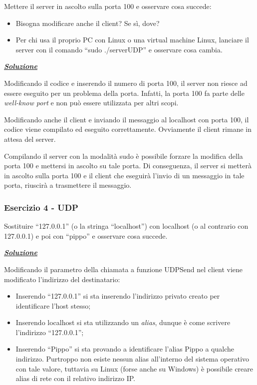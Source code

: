 \documentclass[a4paper]{article}
\newcommand{\dquotes}[1]{``#1''}
\begin{document}
	Mettere il server in ascolto sulla porta 100 e osservare cosa succede:
	\begin{itemize}
		\item Bisogna modificare anche il client? Se sì, dove?
		\item Per chi usa il proprio PC con Linux o una virtual machine Linux, lanciare il server con il comando \dquotes{\textsf{sudo ./serverUDP}} e osservare cosa cambia.
	\end{itemize}

	\noindent
	\textcolor{Green4}{\textbf{\emph{\underline{Soluzione}}}}\newline
	
	\noindent
	Modificando il codice e inserendo il numero di porta 100, il server non riesce ad essere eseguito per un problema della porta. Infatti, la porta 100 fa parte delle \emph{well-know port} e non può essere utilizzata per altri scopi.\newline
	
	\noindent
	Modificando anche il client e inviando il messaggio al localhost con porta 100, il codice viene compilato ed eseguito correttamente. Ovviamente il client rimane in attesa del server.\newline
	
	\noindent
	Compilando il server con la modalità \textsf{sudo} è possibile forzare la modifica della porta 100 e mettersi in ascolto su tale porta. Di conseguenza, il server si metterà in ascolto sulla porta 100 e il client che eseguirà l'invio di un messaggio in tale porta, riuscirà a trasmettere il messaggio.\newpage
	
	\subsubsection{Esercizio 4 - UDP}
	
	Sostituire \dquotes{127.0.0.1} (o la stringa \dquotes{localhost}) con localhost (o al contrario con 127.0.0.1) e poi con \dquotes{pippo} e osservare cosa succede.\newline
	
	\noindent
	\textcolor{Green4}{\textbf{\emph{\underline{Soluzione}}}}\newline
	
	\noindent
	Modificando il parametro della chiamata a funzione \textsf{UDPSend} nel client viene modificato l'indirizzo del destinatario:
	\begin{itemize}
		\item Inserendo \dquotes{127.0.0.1} si sta inserendo l'indirizzo privato creato per identificare l'host stesso;

		\item Inserendo \textsf{localhost} si sta utilizzando un \emph{alias}, dunque è come scrivere l'indirizzo \dquotes{127.0.0.1};

		\item Inserendo \dquotes{Pippo} si sta provando a identificare l'alias Pippo a qualche indirizzo. Purtroppo non esiste nessun alias all'interno del sistema operativo con tale valore, tuttavia su Linux (forse anche su Windows) è possibile creare alias di rete con il relativo indirizzo IP.
	\end{itemize}
\end{document}
